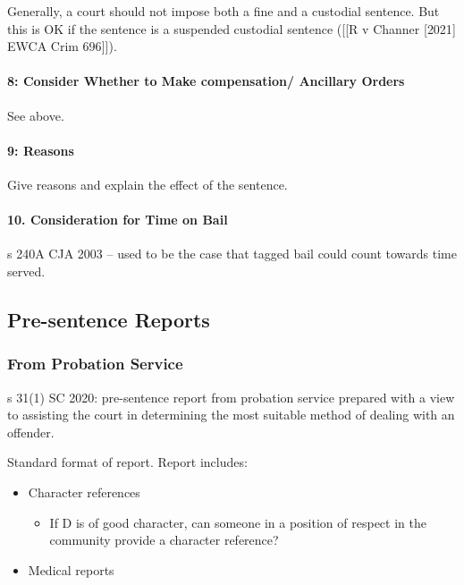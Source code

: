 \documentclass[
]{article}
\providecommand{\tightlist}{%
  \setlength{\itemsep}{0pt}\setlength{\parskip}{0pt}}
\begin{document}
Generally, a court should not impose both a fine and a custodial
sentence. But this is OK if the sentence is a suspended custodial
sentence ({[}{[}R v Channer {[}2021{]} EWCA Crim 696{]}{]}).

\hypertarget{consider-whether-to-make-compensation-ancillary-orders}{%
\paragraph{8: Consider Whether to Make compensation/ Ancillary
Orders}\label{consider-whether-to-make-compensation-ancillary-orders}}

See above.

\hypertarget{reasons}{%
\paragraph{9: Reasons}\label{reasons}}

Give reasons and explain the effect of the sentence.

\hypertarget{consideration-for-time-on-bail}{%
\paragraph{10. Consideration for Time on
Bail}\label{consideration-for-time-on-bail}}

s 240A CJA 2003 -- used to be the case that tagged bail could count
towards time served.

\hypertarget{pre-sentence-reports}{%
\subsection{Pre-sentence Reports}\label{pre-sentence-reports}}

\hypertarget{from-probation-service}{%
\subsubsection{From Probation Service}\label{from-probation-service}}

s 31(1) SC 2020: pre-sentence report from probation service prepared
with a view to assisting the court in determining the most suitable
method of dealing with an offender.

Standard format of report. Report includes:

\begin{itemize}
\tightlist
\item
  Character references

  \begin{itemize}
  \tightlist
  \item
    If D is of good character, can someone in a position of respect in
    the community provide a character reference?
  \end{itemize}
\item
  Medical reports
\end{itemize}
\end{document}
